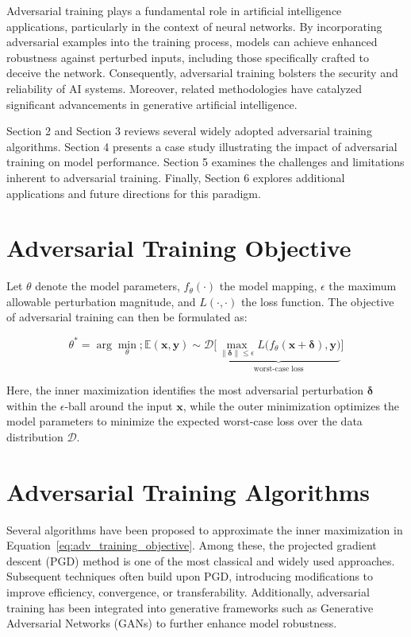 \documentclass[10pt,twocolumn,letterpaper]{article}
\begin{document}
Adversarial training plays a fundamental role in artificial intelligence applications, particularly in the context of neural networks. By incorporating adversarial examples into the training process, models can achieve enhanced robustness against perturbed inputs, including those specifically crafted to deceive the network. Consequently, adversarial training bolsters the security and reliability of AI systems. Moreover, related methodologies have catalyzed significant advancements in generative artificial intelligence.

Section 2 and Section 3 reviews several widely adopted adversarial training algorithms. Section 4 presents a case study illustrating the impact of adversarial training on model performance. Section 5 examines the challenges and limitations inherent to adversarial training. Finally, Section 6 explores additional applications and future directions for this paradigm.

\section{Adversarial Training Objective}
Let $\theta$ denote the model parameters, $f_{\theta}(\cdot)$ the model mapping, $\epsilon$ the maximum allowable perturbation magnitude, and $L(\cdot,\cdot)$ the loss function. The objective of adversarial training can then be formulated as:

\begin{equation}
\theta^{*} = \arg\min_{\theta} ; \mathbb{E}{(\mathbf{x},\mathbf{y}) \sim \mathcal{D}} \Biggl[\underbrace{\max_{{\lVert \mathbf{\delta} \rVert \le \epsilon}} L\bigl(f_{\theta}(\mathbf{x} + \mathbf{\delta}), \mathbf{y}\bigr)}_{\text{worst-case loss}}\Biggr]
\label{eq:adv_training_objective}
\end{equation}

Here, the inner maximization identifies the most adversarial perturbation $\mathbf{\delta}$ within the $\epsilon$-ball around the input $\mathbf{x}$, while the outer minimization optimizes the model parameters to minimize the expected worst-case loss over the data distribution $\mathcal{D}$.

\section{Adversarial Training Algorithms}
Several algorithms have been proposed to approximate the inner maximization in Equation~\eqref{eq:adv_training_objective}. Among these, the projected gradient descent (PGD) method is one of the most classical and widely used approaches. Subsequent techniques often build upon PGD, introducing modifications to improve efficiency, convergence, or transferability. Additionally, adversarial training has been integrated into generative frameworks such as Generative Adversarial Networks (GANs) to further enhance model robustness.
\end{document}
